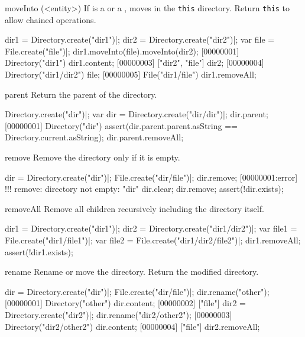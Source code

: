 \begin{urbiscriptapi}
\item[moveInto](<entity>)
  If  is a  or a ,
   moves  in the \lstinline|this| directory.
  Return \lstinline|this| to allow chained operations.
\begin{urbiscript}
dir1 = Directory.create("dir1")|;
dir2 = Directory.create("dir2")|;
var file = File.create("file")|;
dir1.moveInto(file).moveInto(dir2);
[00000001] Directory("dir1")
dir1.content;
[00000003] ["dir2", "file"]
dir2;
[00000004] Directory("dir1/dir2")
file;
[00000005] File("dir1/file")
dir1.removeAll;
\end{urbiscript}

\item[parent]
  Return the parent of the directory.
\begin{urbiscript}
Directory.create("dir")|;
var dir = Directory.create("dir/dir")|;
dir.parent;
[00000001] Directory("dir")
assert(dir.parent.parent.asString == Directory.current.asString);
dir.parent.removeAll;
\end{urbiscript}

\item[remove]
  Remove the directory only if it is empty.
\begin{urbiscript}
dir = Directory.create("dir")|;
File.create("dir/file")|;
dir.remove;
[00000001:error] !!! remove: directory not empty: "dir"
dir.clear;
dir.remove;
assert(!dir.exists);
\end{urbiscript}

\item[removeAll]
  Remove all children recursively including the directory itself.
\begin{urbiscript}
dir1 = Directory.create("dir1")|;
dir2 = Directory.create("dir1/dir2")|;
var file1 = File.create("dir1/file1")|;
var file2 = File.create("dir1/dir2/file2")|;
dir1.removeAll;
assert(!dir1.exists);
\end{urbiscript}

\item[rename]
  Rename or move the directory. Return the modified directory.
\begin{urbiscript}
dir = Directory.create("dir")|;
File.create("dir/file")|;
dir.rename("other");
[00000001] Directory("other")
dir.content;
[00000002] ["file"]
dir2 = Directory.create("dir2")|;
dir.rename("dir2/other2");
[00000003] Directory("dir2/other2")
dir.content;
[00000004] ["file"]
dir2.removeAll;
\end{urbiscript}

\end{urbiscriptapi}


